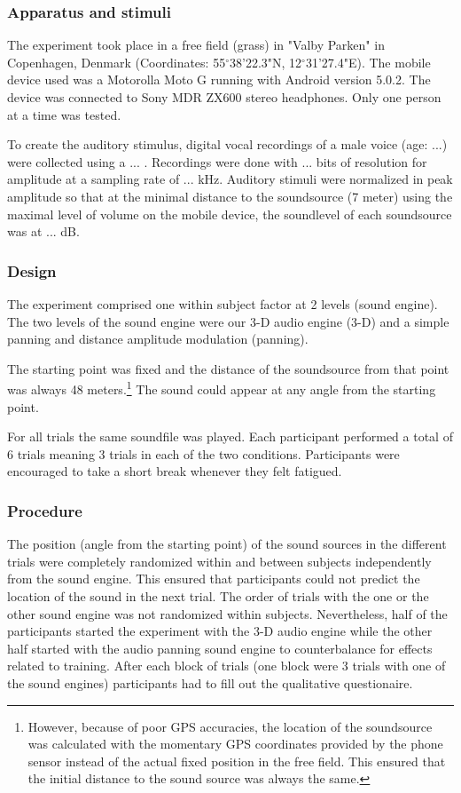 \documentclass[journal]{IEEEtran}
\begin{document}
\subsubsection{Apparatus and stimuli}
The experiment took place in a free field (grass) in "Valby Parken" in Copenhagen, Denmark (Coordinates: 55$^\circ$38'22.3"N, 12$^\circ$31'27.4"E). The mobile device used was a Motorolla Moto G running with Android version 5.0.2. The device was connected to Sony MDR ZX600 stereo headphones. Only one person at a time was tested. 

To create the auditory stimulus, digital vocal recordings of a male voice (age: ...) were collected using a ... . Recordings were done with ... bits of resolution for amplitude at a sampling rate of ...  kHz. Auditory stimuli were normalized in peak amplitude so that at the minimal distance to the soundsource (7 meter) using the maximal level of volume on the mobile device, the soundlevel of each soundsource was at ... dB. 

\subsubsection{Design}
The experiment comprised one within subject factor at 2 levels (sound engine). The two levels of the sound engine were our 3-D audio engine (3-D) and a simple panning and distance amplitude modulation (panning).

The starting point was fixed and the distance of the soundsource from that point was always 48 meters.\footnote{However, because of poor GPS accuracies, the location of the soundsource was calculated with the momentary GPS coordinates provided by the phone sensor instead of the actual fixed position in the free field. This ensured that the initial distance to the sound source was always the same.} The sound could appear at any angle from the starting point.

For all trials the same soundfile was played. Each participant performed a total of 6 trials meaning 3 trials in each of the two conditions. Participants were encouraged to take a short break whenever they felt fatigued.

\subsubsection{Procedure}
The position (angle from the starting point) of the sound sources in the different trials were completely randomized within and between subjects independently from the sound engine. This ensured that participants could not predict the location of the sound in the next trial. The order of trials with the one or the other sound engine was not randomized within subjects. Nevertheless, half of the participants started the experiment with the 3-D audio engine while the other half started with the audio panning sound engine to counterbalance for effects related to training. After each block of trials (one block were 3 trials with one of the sound engines) participants had to fill out the qualitative questionaire.
\end{document}
